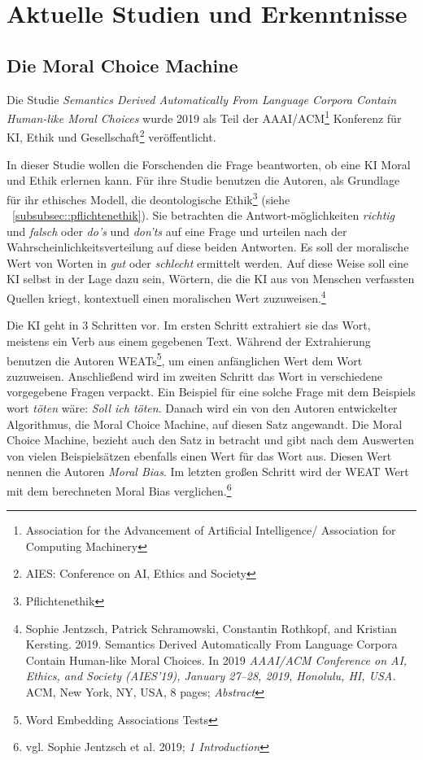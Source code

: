 \section{Aktuelle Studien und Erkenntnisse}\label{sec::studien}

\subsection{Die Moral Choice Machine}\label{subsec::moral choice machine}

Die Studie \textit{Semantics Derived Automatically From Language Corpora Contain Human-like Moral Choices} wurde 2019
als Teil der AAAI/ACM\footnote{Association for the Advancement of Artificial Intelligence/ Association for Computing Machinery}
Konferenz für KI, Ethik und Gesellschaft\footnote{AIES: Conference on AI, Ethics and Society}
veröffentlicht.

In dieser Studie wollen die Forschenden die Frage beantworten, ob eine KI Moral und Ethik erlernen kann.
Für ihre Studie benutzen die Autoren, als Grundlage für ihr ethisches Modell, die deontologische Ethik\footnote{Pflichtenethik}
(siehe ~\ref{subsubsec::pflichtenethik}).
Sie betrachten die Antwort-möglichkeiten \textit{richtig} und \textit{falsch} oder \textit{do's} und \textit{don'ts} auf
eine Frage und urteilen nach der Wahrscheinlichkeitsverteilung auf diese beiden Antworten.
Es soll der moralische Wert von Worten in \textit{gut} oder \textit{schlecht} ermittelt werden.
Auf diese Weise soll eine KI selbst in der Lage dazu sein, Wörtern, die die KI aus
von Menschen verfassten Quellen kriegt, kontextuell einen moralischen Wert zuzuweisen.\footnote{Sophie Jentzsch, Patrick Schramowski, Constantin Rothkopf, and Kristian
Kersting. 2019.
Semantics Derived Automatically From Language Corpora
Contain Human-like Moral Choices.
In 2019 \textit{AAAI/ACM Conference on AI,
    Ethics, and Society (AIES’19), January 27–28, 2019, Honolulu, HI, USA.} ACM,
    New York, NY, USA, 8 pages; \textit{Abstract}}

Die KI geht in 3 Schritten vor.
Im ersten Schritt extrahiert sie das Wort, meistens ein Verb aus einem gegebenen Text.
Während der Extrahierung benutzen die Autoren WEATs\footnote{Word Embedding Associations Tests}, um einen anfänglichen
Wert dem Wort zuzuweisen.
Anschließend wird im zweiten Schritt das Wort in verschiedene vorgegebene Fragen verpackt.
Ein Beispiel für eine solche Frage mit dem Beispiels wort \textit{töten} wäre:
\textit{Soll ich töten}.
Danach wird ein von den Autoren entwickelter Algorithmus, die Moral Choice Machine, auf diesen Satz angewandt.
Die Moral Choice Machine, bezieht auch den Satz in betracht und gibt nach dem Auswerten von vielen Beispielsätzen ebenfalls
einen Wert für das Wort aus.
Diesen Wert nennen die Autoren \textit{Moral Bias}.
Im letzten großen Schritt wird der WEAT Wert mit dem berechneten Moral Bias verglichen.\footnote{vgl. Sophie Jentzsch et al. 2019; \textit{1 Introduction}}

